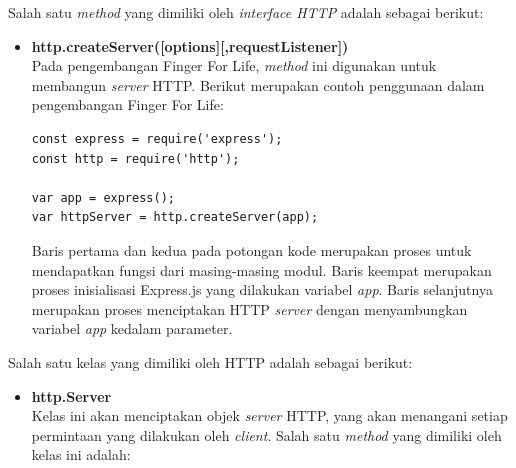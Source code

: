 \begin{enumerate}
\begin{enumerate}
		Salah satu \textit{method} yang dimiliki oleh \textit{interface HTTP} adalah sebagai berikut:
		
		\begin{itemize}
			\item \textbf{http.createServer([options][,requestListener])} \\
			Pada pengembangan Finger For Life, \textit{method} ini digunakan untuk membangun \textit{server} HTTP. Berikut merupakan contoh penggunaan dalam pengembangan Finger For Life:
\begin{lstlisting}[caption={Contoh penggunaan \textit{method createServer(options[,requestListener])}}, label={lst:nodeCreateServer}, captionpos=b]
const express = require('express');
const http = require('http');

var app = express();
var httpServer = http.createServer(app);
\end{lstlisting}

Baris pertama dan kedua pada potongan kode merupakan proses untuk mendapatkan fungsi dari masing-masing modul. Baris keempat merupakan proses inisialisasi Express.js yang dilakukan variabel \textit{app}. Baris selanjutnya merupakan proses menciptakan HTTP \textit{server} dengan menyambungkan variabel \textit{app} kedalam parameter.			
		\end{itemize}
	
		Salah satu kelas yang dimiliki oleh HTTP adalah sebagai berikut:
		\begin{itemize}
			\item \textbf{http.Server} \\
			Kelas ini akan menciptakan objek \textit{server} HTTP, yang akan menangani setiap permintaan yang dilakukan oleh \textit{client}. Salah satu \textit{method} yang dimiliki oleh kelas ini adalah:
			

\end{itemize}
\end{enumerate}
\end{enumerate}
